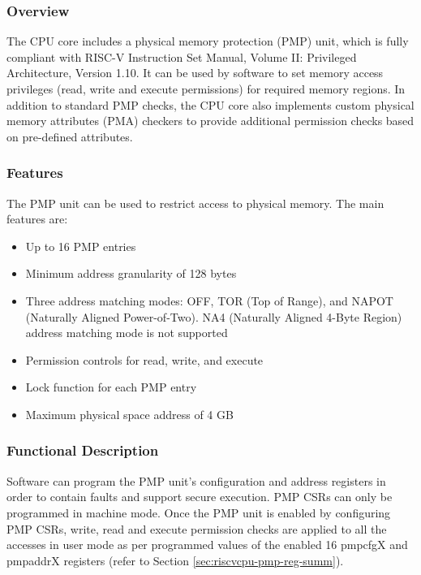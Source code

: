 \documentclass[main\_\_EN.tex]{subfiles}
\begin{document}
\subsubsection{Overview}
\label{sec:riscvcpu-pmp-overview}
The CPU core includes a physical memory protection (PMP) unit, which is fully compliant with RISC-V Instruction Set Manual, Volume II: Privileged Architecture, Version 1.10. It can be used by software to set memory access privileges (read, write and execute permissions) for required memory regions. In addition to standard PMP checks, the CPU core also implements custom physical memory attributes (PMA) checkers to provide additional permission checks based on pre-defined attributes.

\subsubsection{Features}
\label{sec:riscvcpu-pmp-features}

The PMP unit can be used to restrict access to physical memory. The main features are:

\begin{itemize}
    \item Up to 16 PMP entries
    \item Minimum address granularity of 128 bytes
    \item Three address matching modes: OFF, TOR (Top of Range), and NAPOT (Naturally Aligned Power-of-Two). NA4 (Naturally Aligned 4-Byte Region) address matching mode is not supported
    \item Permission controls for read, write, and execute
    \item Lock function for each PMP entry
    \item Maximum physical space address of 4 GB
\end{itemize}

\subsubsection{Functional Description}
\label{sec:riscvcpu-pmp-func-descr}
Software can program the PMP unit's configuration and address registers in order to contain faults and support secure execution. PMP CSRs can only be programmed in machine mode. Once the PMP unit is enabled by configuring PMP CSRs, write, read and execute permission checks are applied to all the accesses in user mode as per programmed values of the enabled 16 pmpcfgX and pmpaddrX registers (refer to Section \ref{sec:riscvcpu-pmp-reg-summ}).
\end{document}
